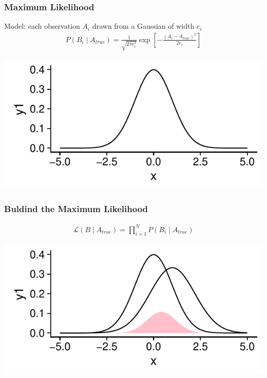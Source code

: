 \documentclass[handout]{beamer}\usepackage[]{graphicx}\usepackage[]{color}
\makeatletter
\def\maxwidth{ %
  \ifdim\Gin@nat@width>\linewidth
    \linewidth
  \else
    \Gin@nat@width
  \fi
}
\newenvironment{knitrout}{}{} %
\makeatother
\begin{document}

\begin{frame}
\frametitle{Maximum Likelihood}
\pause
Model: each observation $A_i$ drawn from a Gaussian of width $e_{i}$
\begin{align*}
P(B_{i} \mid A_{true}) =  \frac{1}{\sqrt{2 \pi e_{i}^2}} \exp \left[ -\frac{(A_{i} - A_{true})^2}{2 e_{i}} \right]
\end{align*}




\begin{knitrout}
\color{fgcolor}
\includegraphics[width=\maxwidth]{figure/unnamed-chunk-1-1} 

\end{knitrout}

\end{frame}

\begin{frame}
\frametitle{Buldind the Maximum Likelihood}
\begin{align*}
\mathcal{L}(B \mid A_{true}) =  \prod_{i=1}^{N} P(B_{i} \mid A_{true})
\end{align*}

\begin{knitrout}
\color{fgcolor}
\includegraphics[width=\maxwidth]{figure/unnamed-chunk-2-1} 

\end{knitrout}

\end{frame}
\end{document}
